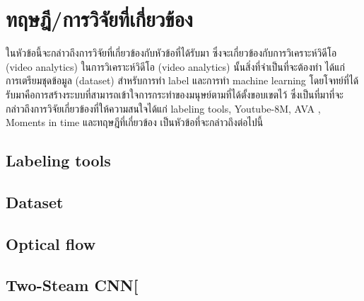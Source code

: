 \clearpage
\chapter{ทฤษฎี/การวิจัยที่เกี่ยวข้อง}
ในหัวข้อนี้จะกล่าวถึงการวิจัยที่เกี่ยวข้องกับหัวข้อที่ได้รับมา ซึ่งจะเกี่ยวข้องกับการวิเคราะห์วิดีโอ (video analytics) ในการวิเคราะห์วิดีโอ (video analytics) นั้นสิ่งที่จำเป็นที่จะต้องทำ ได้แก่ การเตรียมชุดข้อมูล (dataset) สำหรับการทำ label และการทำ machine learning โดยโจทย์ที่ได้รับมาคือการสร้างระบบที่สามารถเข้าใจการกระทำของมนุษย์ตามที่ได้ตั้งขอบเขตไว้ ซึ่งเป็นที่มาที่จะกล่าวถึงการวิจัยเกี่ยวข้องที่ให้ความสนใจได้แก่ labeling tools, Youtube-8M, AVA , Moments in time และทฤษฎีที่เกี่ยวข้อง เป็นหัวข้อที่จะกล่าวถึงต่อไปนี้


\section{Labeling tools}


\clearpage
\section{Dataset}

\clearpage

\clearpage


\clearpage
\section{Optical flow}


\section{Two-Steam CNN[}



